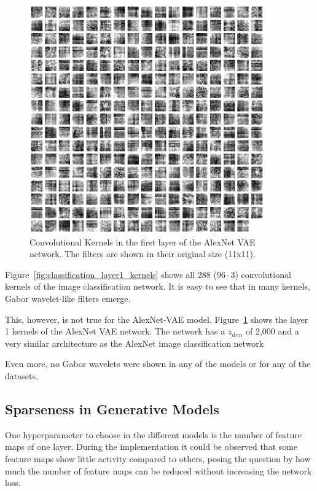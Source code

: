 \begin{figure}
    \centering
    \includegraphics[width=0.9\textwidth]{images/alexnet_vae_l1_kernels.png}
    \caption[\ac{VAE} - Layer 1 Kernels]{Convolutional Kernels in the first layer of the AlexNet \ac{VAE} network. The filters are shown in their original size (11x11).}
    \label{fig:vae_layer1_kernels}
\end{figure}

Figure~\ref{fig:classification_layer1_kernels} shows all 288 ($96 \cdot 3$) convolutional kernels of the image classification network.
It is easy to see that in many kernels, Gabor wavelet-like filters emerge.

This, however, is not true for the AlexNet-\ac{VAE} model.
Figure~\ref{fig:vae_layer1_kernels} shows the layer 1 kernels of the AlexNet \ac{VAE} network.
The network has a $z_{dim}$ of 2,000 and a very similar architecture as the AlexNet image classification network

Even more, no Gabor wavelets were shown in any of the models or for any of the datasets.


\subsection{Sparseness in Generative Models}\label{subsec:effective-network-capacity}
One hyperparameter to choose in the different models is the number of feature maps of one layer.
During the implementation it could be observed that some feature maps show little activity compared to others, posing the question by how much the number of feature maps can be reduced without increasing the network loss.

